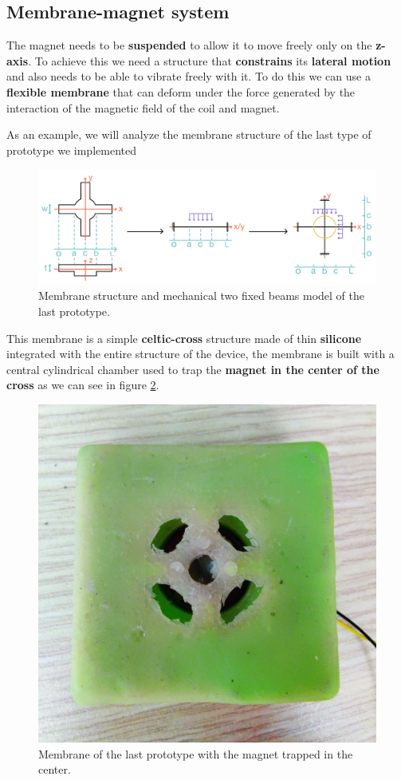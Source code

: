 \subsection{Membrane-magnet system}
\label{sec: Membrane-magnet_system}

The magnet needs to be \textbf{suspended} to allow it to move freely only on the \textbf{z-axis}.
To achieve this we need a structure that \textbf{constrains} its \textbf{lateral motion} and also needs to be able to vibrate freely with it.
To do this we can use a \textbf{flexible membrane} that can deform under the force generated by the interaction of the magnetic field of the coil and magnet. 

\begin{samepage}
    As an example, we will analyze the membrane structure of the last type of prototype we implemented %
    \nopagebreak

    \begin{figure}[H]
        \centering
        \includegraphics[width=0.9\linewidth]{Chapters/Chapter2/Modelling_of_Entire_System/Figures/membr_mech_model.jpg} 
        \caption[Membrane structure]{Membrane structure and mechanical two fixed beams model of the last prototype.}
        \label{fig: Membrane_structure}
    \end{figure}
\end{samepage}

\begin{samepage}
    This membrane is a simple \textbf{celtic-cross} structure made of thin \textbf{silicone} integrated with the entire structure of the device, the membrane is built with a central cylindrical chamber used to trap the \textbf{magnet in the center of the cross} as we can see in figure \ref{fig: Membrane_trap}.
    \nopagebreak
    \begin{figure}[H]
        \centering
        \includegraphics[width = 0.25\linewidth]{Chapters/Chapter2/Modelling_of_Entire_System/Figures/Flexible_mat_small_top.jpg}
        \caption[Membrane mat]{Membrane of the last prototype with the magnet trapped in the center.}
        \label{fig: Membrane_trap}
    \end{figure}
\end{samepage}

